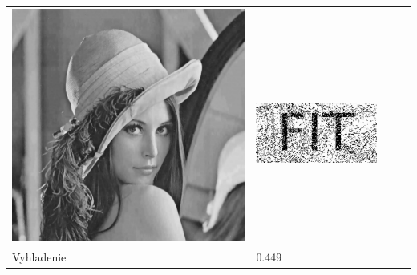 \begin{table}[h]
\begin{tabular}{llcc}
\begin{minipage}[c]{.1\textwidth}
  \includegraphics[scale=0.1]{obrazky/enhance}
\end{minipage} &
\begin{minipage}[c]{.15\textwidth}
\ 
  \includegraphics[scale=0.25]{obrazky/enhance-wm}
\end{minipage} \\
Vyhladenie                             & 0.449 &
\begin{minipage}[c]{.1\textwidth}
\ 

\end{minipage}
\end{tabular}
\end{table}
